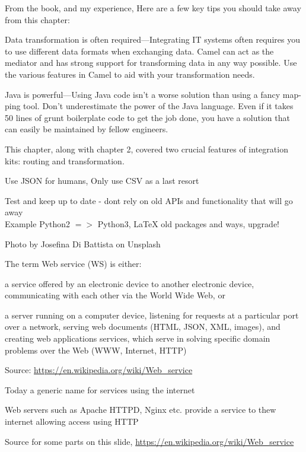 \documentclass[Screen16to9,17pt]{foils}
\begin{document}
From the book, and my experience, Here are a few key tips you should take away from this chapter:
\begin{list2}
\item  Data transformation is often required—Integrating IT systems often requires you to
use different data formats when exchanging data. Camel can act as the mediator
and has strong support for transforming data in any way possible. Use the various
features in Camel to aid with your transformation needs.
\item Java is powerful—Using Java code isn’t a worse solution than using a fancy map-
ping tool. Don’t underestimate the power of the Java language. Even if it takes 50
lines of grunt boilerplate code to get the job done, you have a solution that can
easily be maintained by fellow engineers.
\item This chapter, along with chapter 2, covered two crucial features of integration kits:
routing and transformation.
\vskip 1cm
\item Use JSON for humans, Only use CSV as a last resort
\item Test and keep up to date - dont rely on old APIs and functionality that will go away\\
Example Python2 $=>$ Python3, LaTeX old packages and ways, upgrade!
\end{list2}



Photo by Josefina Di Battista on Unsplash



  The term Web service (WS) is either:
  \begin{list2}
  \item  a service offered by an electronic device to another electronic device, communicating with each other via the World Wide Web, or
  \item a server running on a computer device, listening for requests at a particular port over a network, serving web documents (HTML, JSON, XML, images), and creating web applications services, which serve in solving specific domain problems over the Web (WWW, Internet, HTTP)
\end{list2}
Source: \url{https://en.wikipedia.org/wiki/Web_service}

\begin{list2}
\item Today a generic name for services using the internet
\item Web servers such as Apache HTTPD, Nginx etc. provide a service to thew internet allowing access using HTTP
\item Source for some parts on this slide, \url{https://en.wikipedia.org/wiki/Web_service}
\end{list2}
\end{document}
